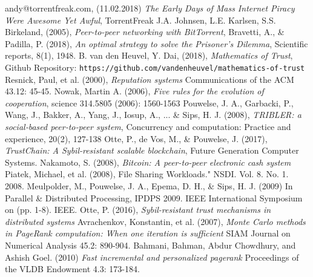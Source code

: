 \documentclass[sigconf]{acmart}
\theoremstyle{definition}
\begin{document}
\begin{thebibliography}{9}
andy@torrentfreak.com, (11.02.2018)
\textit{The Early Days of Mass Internet Piracy Were Awesome Yet Awful},
TorrentFreak
J.A. Johnsen, L.E. Karlsen, S.S. Birkeland, (2005),
\textit{Peer-to-peer networking with BitTorrent},
Bravetti, A., \& Padilla, P. (2018), 
\textit{An optimal strategy to solve the Prisoner's Dilemma},
Scientific reports, 8(1), 1948.
B. van den Heuvel, Y. Dai, (2018),
\textit{Mathematics of Trust},
Github Repository: \hspace{0.3em} {\tt https://github.com/vandenheuvel/mathematics-of-trust}
Resnick, Paul, et al. (2000),
\textit{Reputation systems} 
Communications of the ACM 43.12: 45-45.
Nowak, Martin A. (2006),
\textit{Five rules for the evolution of cooperation},
science 314.5805 (2006): 1560-1563
Pouwelse, J. A., Garbacki, P., Wang, J., Bakker, A., Yang, J., Iosup, A., ... \& Sips, H. J. (2008),
\textit{TRIBLER: a social‐based peer‐to‐peer system},
Concurrency and computation: Practice and experience, 20(2), 127-138
Otte, P., de Vos, M., \& Pouwelse, J. (2017),
\textit{TrustChain: A Sybil-resistant scalable blockchain},
Future Generation Computer Systems.
Nakamoto, S. (2008),
\textit{Bitcoin: A peer-to-peer electronic cash system}
Piatek, Michael, et al. (2008), 
File Sharing Workloads." NSDI. Vol. 8. No. 1. 2008.
Meulpolder, M., Pouwelse, J. A., Epema, D. H., \& Sips, H. J. (2009)
In Parallel \& Distributed Processing, IPDPS 2009. IEEE International Symposium on (pp. 1-8). IEEE.
Otte, P. (2016),
\textit{Sybil-resistant trust mechanisms in distributed systems}
Avrachenkov, Konstantin, et al. (2007), 
\textit{Monte Carlo methods in PageRank computation: When one iteration is sufficient}
SIAM Journal on Numerical Analysis 45.2: 890-904.
Bahmani, Bahman, Abdur Chowdhury, and Ashish Goel. (2010)
\textit{Fast incremental and personalized pagerank}
Proceedings of the VLDB Endowment 4.3: 173-184.





\end{thebibliography}
\end{document}
